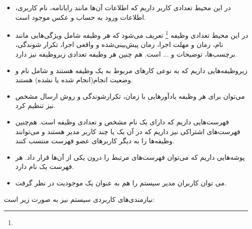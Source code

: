 \documentclass{article}
\begin{document}
\begin{itemize}

\item در این محیط تعدادی کاربر داریم که اطلاعات آن‌ها مانند رایانامه، نام‌ کاربری، اطلاعات ورود به حساب و عکس موجود است.

\item در این محیط تعدادی وظیفه
\footnote{}
 تعریف می‌شود که هر وظیفه شامل ویژگی‌هایی مانند نام، زمان و مهلت اجرا، زمان پیش‌بینی‌شده و واقعی اجرا، تکرار شوندگی، برچسب‌ها، توضیحات و ... است. هم چنین هر وظیفه تعدادی زیر‌‌وظیفه نیز دارد.
 
 \item زیروظیفه‌هایی داریم که به نوعی کار‌های مربوط به یک وظیفه هستند و شامل نام و وضعیت انجام(انجام شده یا نشده) هستند.
 
 \item می‌توان برای هر وظیفه‌ یادآور‌هایی با زمان، تکرار‌شوندگی و روش ارسال مشخص نیز تنظیم کرد.
 
 \item فهرست‌هایی داریم که دارای یک نام مشخص و تعدادی وظیفه است. هم‌چنین فهرست‌های اشتراکی نیز داریم که در آن یک یا چند کاربر مدیر هستند و می‌توانند وظیفه‌ها را به دیگر کاربر‌های عضو فهرست منتسب کنند.
 
\item پوشه‌هایی داریم که می‌توان فهرست‌های مرتبط را درون یکی از آن‌ها قرار داد. هر فهرست یک نام دارد.

\item
می توان کاربران مدیر سیستم را هم به عنوان یک موجودیت در نظر گرفت.

\end{itemize}

نیازمندی‌های کاربردی سیستم نیز به صورت زیر است:
\end{document}
